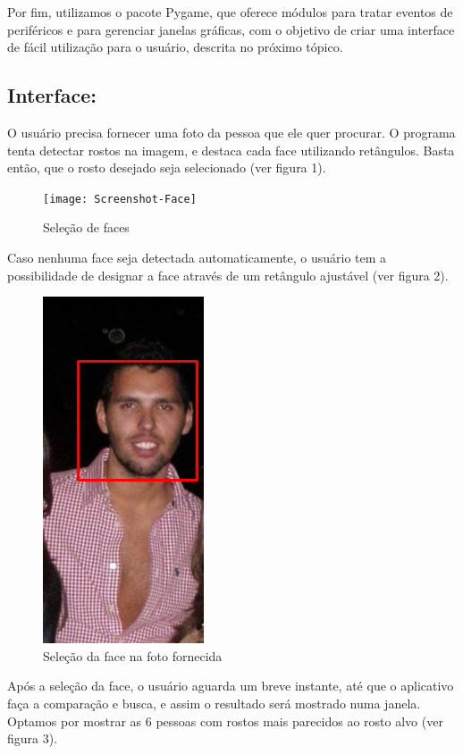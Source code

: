 \documentclass[10pt,a4paper]{article}
\begin{document}
	Por fim, utilizamos o pacote Pygame, que oferece módulos para tratar eventos de periféricos e para gerenciar janelas gráficas, com o objetivo de criar uma interface de fácil utilização para o usuário, descrita no próximo tópico.

\subsection*{Interface:}
	O usuário precisa fornecer uma foto da pessoa que ele quer procurar. O programa tenta detectar rostos na imagem, e destaca cada face utilizando retângulos. Basta então, que o rosto desejado seja selecionado (ver figura 1).

\begin{figure}[h!]
  \begin{center}
    \texttt{[image: Screenshot-Face]}
    \caption{Seleção de faces}
  \end{center}
\end{figure}

Caso nenhuma face seja detectada automaticamente, o usuário tem a possibilidade de designar a face através de um retângulo ajustável (ver figura 2).

\begin{figure}[h!]
  \begin{center}
    \includegraphics[scale=0.4]{samephoto}
    \caption{ Seleção da face na foto fornecida}
  \end{center}
\end{figure}

Após a seleção da face, o usuário aguarda um breve instante, até que o
aplicativo faça a comparação e busca, e assim o resultado será
mostrado numa janela. Optamos por mostrar as 6 pessoas com rostos mais
parecidos ao rosto alvo (ver figura 3).
\end{document}
